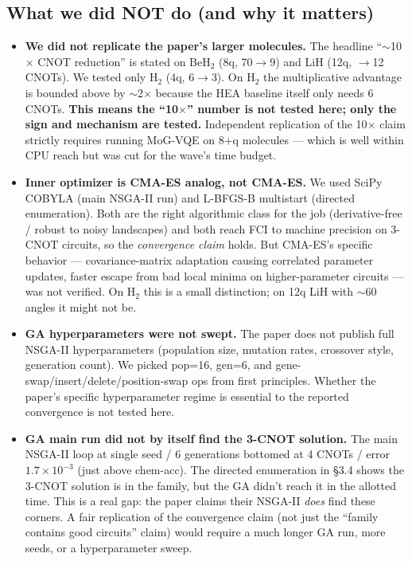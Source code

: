\documentclass[11pt]{article}
\begin{document}
\subsection{What we did NOT do (and why it matters)}
\begin{itemize}
  \item \textbf{We did not replicate the paper's larger molecules.} The headline
    ``$\sim$10$\times$ CNOT reduction'' is stated on BeH$_2$ (8q, 70$\to$9) and LiH (12q,
    $\to$12 CNOTs). We tested only H$_2$ (4q, 6$\to$3). On H$_2$ the multiplicative
    advantage is bounded above by $\sim$2$\times$ because the HEA baseline itself only
    needs 6 CNOTs. \textbf{This means the ``10$\times$'' number is not tested here; only
    the sign and mechanism are tested.} Independent replication of the 10$\times$ claim
    strictly requires running MoG-VQE on 8+q molecules --- which is well within CPU reach
    but was cut for the wave's time budget.
  \item \textbf{Inner optimizer is CMA-ES analog, not CMA-ES.} We used SciPy COBYLA
    (main NSGA-II run) and L-BFGS-B multistart (directed enumeration). Both are the right
    algorithmic class for the job (derivative-free / robust to noisy landscapes) and both
    reach FCI to machine precision on 3-CNOT circuits, so the \emph{convergence claim}
    holds. But CMA-ES's specific behavior --- covariance-matrix adaptation causing correlated
    parameter updates, faster escape from bad local minima on higher-parameter circuits ---
    was not verified. On H$_2$ this is a small distinction; on 12q LiH with $\sim$60
    angles it might not be.
  \item \textbf{GA hyperparameters were not swept.} The paper does not publish full NSGA-II
    hyperparameters (population size, mutation rates, crossover style, generation count).
    We picked pop=16, gen=6, and gene-swap/insert/delete/position-swap ops from first
    principles. Whether the paper's specific hyperparameter regime is essential to the
    reported convergence is not tested here.
  \item \textbf{GA main run did not by itself find the 3-CNOT solution.} The main NSGA-II
    loop at single seed / 6 generations bottomed at 4 CNOTs / error $1.7\!\times\!10^{-3}$
    (just above chem-acc). The directed enumeration in \S3.4 shows the 3-CNOT solution
    is in the family, but the GA didn't reach it in the allotted time. This is a real gap:
    the paper claims their NSGA-II \emph{does} find these corners. A fair replication of the
    convergence claim (not just the ``family contains good circuits'' claim) would require
    a much longer GA run, more seeds, or a hyperparameter sweep.
\end{itemize}
\end{document}
